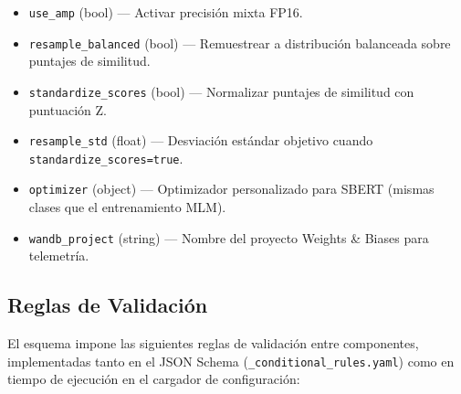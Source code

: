 \begin{itemize}[nosep]
    \item \texttt{use\_amp} (bool) --- Activar precisión mixta FP16.
    \item \texttt{resample\_balanced} (bool) --- Remuestrear a distribución balanceada sobre puntajes de similitud.
    \item \texttt{standardize\_scores} (bool) --- Normalizar puntajes de similitud con puntuación Z.
    \item \texttt{resample\_std} (float) --- Desviación estándar objetivo cuando \texttt{standardize\_scores=true}.
    \item \texttt{optimizer} (object) --- Optimizador personalizado para SBERT (mismas clases que el entrenamiento MLM).
    \item \texttt{wandb\_project} (string) --- Nombre del proyecto Weights \& Biases para telemetría.
\end{itemize}

\subsection{Reglas de Validación}

El esquema impone las siguientes reglas de validación entre componentes, implementadas tanto en el JSON Schema (\texttt{\_conditional\_rules.yaml}) como en tiempo de ejecución en el cargador de configuración:


